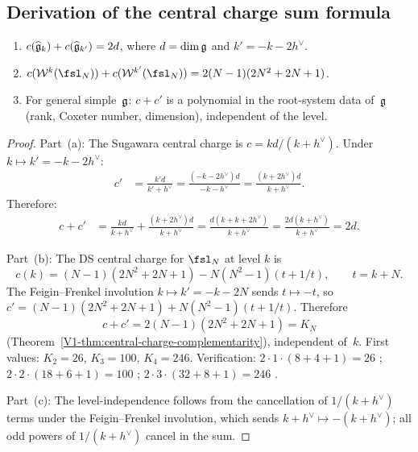 %
%

\subsection{Derivation of the central charge sum formula}

\begin{theorem}
\begin{enumerate}[label=\textup{(\alph*)}]
\item $c(\widehat{\mathfrak{g}}_k) + c(\widehat{\mathfrak{g}}_{k'}) = 2d$, where
 $d = \dim\mathfrak{g}$ and $k' = -k - 2h^\vee$.
\item $c(\mathcal{W}^k(\fsl_N)) + c(\mathcal{W}^{k'}(\fsl_N))
 = 2(N-1)(2N^2+2N+1)$.
\item For general simple~$\mathfrak{g}$: $c + c'$ is a polynomial in the
 root-system data of~$\mathfrak{g}$ (rank, Coxeter number, dimension),
 independent of the level.
\end{enumerate}
\end{theorem}

\begin{proof}
Part~(a): The Sugawara central charge is $c = kd/(k + h^\vee)$. Under
$k \mapsto k' = -k - 2h^\vee$:
\begin{align*}
c' &= \frac{k'd}{k' + h^\vee}
= \frac{(-k-2h^\vee)d}{-k-h^\vee}
= \frac{(k+2h^\vee)d}{k+h^\vee}.
\end{align*}
Therefore:
\begin{align*}
c + c' &= \frac{kd}{k+h^\vee} + \frac{(k+2h^\vee)d}{k+h^\vee}
= \frac{d(k + k + 2h^\vee)}{k + h^\vee}
= \frac{2d(k + h^\vee)}{k + h^\vee}
= 2d.
\end{align*}

Part~(b): The DS central charge for $\fsl_N$ at level $k$ is
\[
c(k) = (N-1)(2N^2+2N+1) - N(N^2-1)(t + 1/t), \qquad t = k + N.
\]
The Feigin--Frenkel involution $k \mapsto k' = -k - 2N$ sends $t \mapsto -t$,
so $c' = (N-1)(2N^2+2N+1) + N(N^2-1)(t + 1/t)$. Therefore
\[
c + c' = 2(N-1)(2N^2+2N+1) = K_N
\]
(Theorem~\ref{V1-thm:central-charge-complementarity}),
independent of~$k$.
First values: $K_2 = 26$, $K_3 = 100$, $K_4 = 246$.
Verification: $2 \cdot 1 \cdot (8+4+1) = 26$ \checkmark;
$2 \cdot 2 \cdot (18+6+1) = 100$ \checkmark;
$2 \cdot 3 \cdot (32+8+1) = 246$ \checkmark.

Part~(c): The level-independence follows from the cancellation of $1/(k+h^\vee)$
terms under the Feigin--Frenkel involution, which sends
$k + h^\vee \mapsto -(k + h^\vee)$; all odd powers of $1/(k+h^\vee)$
cancel in the sum.
\end{proof}

